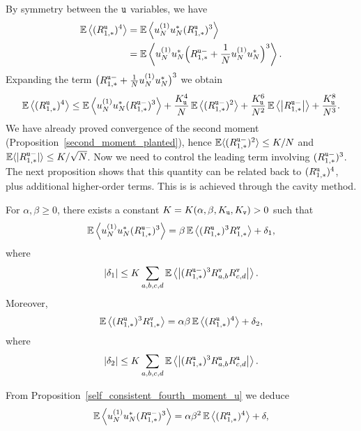\documentclass[final,12pt]{colt2018} %
\newcommand{\utt}{\textup{\texttt{u}}}
\newcommand{\vtt}{\textup{\texttt{v}}}
\begin{document}
By symmetry between the $\utt$ variables, we have
\begin{align*}
\E\left \langle (R^{\utt}_{1,*})^4\right \rangle &= \E\left \langle u^{(1)}_{N}u^{*}_{N}(R^{\utt}_{1,*})^3\right \rangle \\
&= \E\left \langle u^{(1)}_{N}u^{*}_{N}\Big(R^{\utt - }_{1,*} + \frac{1}{N}u^{(1)}_{N}u^{*}_{N}\Big)^3\right \rangle. 
\end{align*}
Expanding the term $\big(R^{\utt - }_{1,*} + \frac{1}{N}u^{(1)}_{N}u^{*}_{N}\big)^3$ we obtain
\begin{equation}\label{first_upper_bound_fourth_moment}
\E\left \langle (R^{\utt}_{1,*})^4\right \rangle \le \E\left \langle u^{(1)}_{N}u^{*}_{N}(R^{\utt - }_{1,*})^3\right \rangle + \frac{K_\utt^4}{N}\E\left \langle (R^{\utt - }_{1,*})^2 \right \rangle + \frac{K_\utt^6}{N^2}\E\left \langle \big|R^{\utt - }_{1,*}\big| \right \rangle + \frac{K_\utt^8}{N^3}.
\end{equation}
We have already proved convergence of the second moment (Proposition~\ref{second_moment_planted}), hence $\E \langle (R^{\utt - }_{1,*})^2  \rangle \le K/N$ and $\E \langle |R^{\utt - }_{1,*}|  \rangle \le K/\sqrt{N}$. Now we need to control the leading term involving $(R^{\utt - }_{1,*})^3$. The next proposition shows that this quantity can be related back to $(R^{\utt}_{1,*})^4$, plus additional higher-order terms. This is is achieved through the cavity method.  
\begin{proposition}\label{self_consistent_fourth_moment_u} 
For $\alpha,\beta \ge 0$, there exists a constant $K = K(\alpha,\beta,K_{\utt},K_{\vtt}) >0$ such that
\begin{equation}\label{cavity_u_1}
\E\left \langle u^{(1)}_{N}u^{*}_{N}(R^{\utt-}_{1,*})^3\right \rangle = \beta\E\left \langle(R^{\utt}_{1,*})^3R^{\vtt}_{1,*}\right \rangle + \delta_1,
\end{equation}
where 
\[|\delta_1| \le K\sum_{a,b,c,d} \E\left \langle \abs{(R^{\utt-}_{1,*})^3R^{\vtt}_{a,b}R^{\vtt}_{c,d}}\right \rangle.\]
Moreover, 
\begin{equation}\label{cavity_v_1}
\E\left \langle(R^{\utt}_{1,*})^3R^{\vtt}_{1,*}\right \rangle  = \alpha\beta\E\left \langle(R^{\utt}_{1,*})^4\right \rangle + \delta_2,
\end{equation}
where
\[|\delta_2| \le K\sum_{a,b,c,d} \E\left \langle \abs{(R^{\utt}_{1,*})^3R^{\utt}_{a,b}R^{\utt}_{c,d}}\right \rangle.\]
\end{proposition}
From Proposition~\ref{self_consistent_fourth_moment_u} we deduce 
\[\E\left \langle u^{(1)}_{N}u^{*}_{N}(R^{\utt-}_{1,*})^3\right \rangle =\alpha\beta^2\E\left \langle(R^{\utt}_{1,*})^4\right \rangle + \delta,\]
\end{document}
